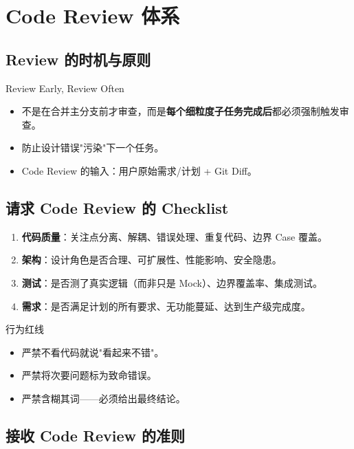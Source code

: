 \section{Code Review 体系}

\subsection{Review 的时机与原则}

\begin{importantbox}{{Review Early, Review Often}}
\begin{itemize}
    \item 不是在合并主分支前才审查，而是\textbf{每个细粒度子任务完成后}都必须强制触发审查。
    \item 防止设计错误"污染"下一个任务。
    \item Code Review 的输入：用户原始需求/计划 + Git Diff。
\end{itemize}
\end{importantbox}

\subsection{请求 Code Review 的 Checklist}

\begin{enumerate}
    \item \textbf{代码质量}：关注点分离、解耦、错误处理、重复代码、边界 Case 覆盖。
    \item \textbf{架构}：设计角色是否合理、可扩展性、性能影响、安全隐患。
    \item \textbf{测试}：是否测了真实逻辑（而非只是 Mock）、边界覆盖率、集成测试。
    \item \textbf{需求}：是否满足计划的所有要求、无功能蔓延、达到生产级完成度。
\end{enumerate}

\begin{warningbox}{行为红线}
\begin{itemize}
    \item 严禁不看代码就说"看起来不错"。
    \item 严禁将次要问题标为致命错误。
    \item 严禁含糊其词——必须给出最终结论。
\end{itemize}
\end{warningbox}

\subsection{接收 Code Review 的准则}

